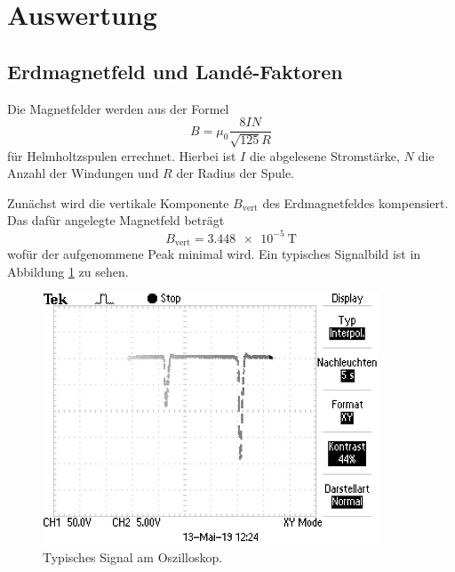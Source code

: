 \newpage
\section{Auswertung}
\subsection{Erdmagnetfeld und Landé-Faktoren}
\label{sec:Auswertung}

\FloatBarrier
Die Magnetfelder werden aus der Formel
\begin{equation}
B=\mu_0\frac{8 I N}{\sqrt{125}R}
\end{equation}
für Helmholtzspulen errechnet.
Hierbei ist $I$ die abgelesene Stromstärke, $N$ die Anzahl der Windungen und $R$ der Radius der Spule.

Zunächst wird die vertikale Komponente $B_{\text{vert}}$ des Erdmagnetfeldes kompensiert.
Das dafür angelegte Magnetfeld beträgt
\begin{equation}
B_{\text{vert}}=\SI{3.448e-5}{\tesla}
\end{equation}
wofür der aufgenommene Peak minimal wird.
Ein typisches Signalbild ist in Abbildung \ref{fig:Signal} zu sehen.
 \begin{figure}
   \centering
   \includegraphics[width=10cm]{pictures/TEK0008.JPG}
   \caption{Typisches Signal am Oszilloskop.}
   \label{fig:Signal}
 \end{figure}
 \FloatBarrier

